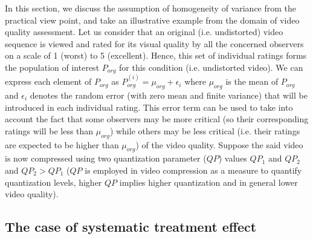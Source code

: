 \documentclass[10pt,final,Twcolumn]{IEEEtran}
\begin{document}
In this section, we discuss the assumption of homogeneity of variance from the practical view point, and take an illustrative example from the domain of video quality assessment. Let us consider that an original (i.e. undistorted) video sequence is viewed and rated for its visual quality by all the concerned observers on a scale of 1 (worst) to 5 (excellent). Hence, this set of individual ratings forms the population of interest $P_{org}$ for this condition (i.e. undistorted video). We can express each element of $P_{org}$ as $P_{org}^{(i)}= {\mu_{org}+\epsilon_i}$ where $\mu_{org}$ is the mean of $P_{org}$ and $\epsilon_i$ denotes the random error (with zero mean and finite variance) that will be introduced in each individual rating. This error term can be used to take into account the fact that some observers may be more critical (so their corresponding ratings will be less than $\mu_{org}$) while others may be less critical (i.e. their ratings are expected to be higher than $\mu_{org}$) of the video quality. Suppose the said video is now compressed using two quantization parameter ($QP$) values $QP_1$ and $QP_2$ and $QP_2>QP_1$ ($QP$ is employed in video compression as a measure to quantify quantization levels, higher $QP$ implies higher quantization and in general lower video quality). 

\subsection{The case of systematic treatment effect}
\end{document}
